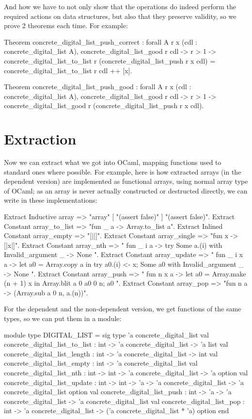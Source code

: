 \documentclass{article}
\begin{document}
And how we have to not only show that the operations do indeed perform the required actions on data structures, but also that they preserve validity, so we prove 2 theorems each time. For example:

\begin{coq}
Theorem concrete_digital_list_push_correct :
  forall {A} r x (cdl : concrete_digital_list A),
  concrete_digital_list_good r cdl ->
  r > 1 ->
  concrete_digital_list_to_list r (concrete_digital_list_push r x cdl) =
    concrete_digital_list_to_list r cdl ++ [x].

Theorem concrete_digital_list_push_good :
  forall {A} r x (cdl : concrete_digital_list A),
  concrete_digital_list_good r cdl ->
  r > 1 ->
  concrete_digital_list_good r (concrete_digital_list_push r x cdl).
\end{coq}

\section{Extraction}

Now we can extract what we got into OCaml, mapping functions used to standard ones where possible. For example, here is how extracted arrays (in the dependent version) are implemented as functional arrays, using normal array type of OCaml; as an array is never actually constructed or destructed directly, we can write  in these implementations:

\begin{coq}
Extract Inductive array => "array" [ "(assert false)" ] "(assert false)".
Extract Constant array_to_list => "fun _ a -> Array.to_list a".
Extract Inlined Constant array_empty => "[||]".
Extract Constant array_single => "fun x -> [|x|]".
Extract Constant array_nth => "
  fun _ i a ->
    try Some a.(i)
    with Invalid_argument _ -> None
".
Extract Constant array_update => "
  fun _ i x a ->
    let a0 = Array.copy a in
    try
      a0.(i) <- x;
      Some a0
    with Invalid_argument _ -> None
".
Extract Constant array_push => "
  fun n x a ->
    let a0 = Array.make (n + 1) x in
    Array.blit a 0 a0 0 n;
    a0
".
Extract Constant array_pop => "fun n a -> (Array.sub a 0 n, a.(n))".
\end{coq}

For the dependent and the non-dependent version, we get functions of the same types, so we can put them in a module:

\begin{coq}
module type DIGITAL_LIST = sig
  type 'a concrete_digital_list
  val concrete_digital_list_to_list : int -> 'a concrete_digital_list -> 'a list
  val concrete_digital_list_length : int -> 'a concrete_digital_list -> int
  val concrete_digital_list_empty : int -> 'a concrete_digital_list
  val concrete_digital_list_nth : int -> int -> 'a concrete_digital_list -> 'a option
  val concrete_digital_list_update : int -> int -> 'a -> 'a concrete_digital_list -> 'a concrete_digital_list option
  val concrete_digital_list_push : int -> 'a -> 'a concrete_digital_list -> 'a concrete_digital_list
  val concrete_digital_list_pop : int -> 'a concrete_digital_list -> ('a concrete_digital_list * 'a) option
end
\end{coq}
\end{document}
